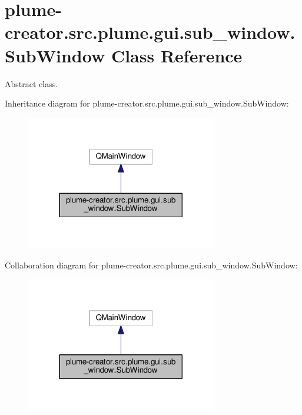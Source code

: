 \hypertarget{classplume-creator_1_1src_1_1plume_1_1gui_1_1sub__window_1_1_sub_window}{}\section{plume-\/creator.src.\+plume.\+gui.\+sub\+\_\+window.\+Sub\+Window Class Reference}
\label{classplume-creator_1_1src_1_1plume_1_1gui_1_1sub__window_1_1_sub_window}


Abstract class.  




Inheritance diagram for plume-\/creator.src.\+plume.\+gui.\+sub\+\_\+window.\+Sub\+Window\+:\nopagebreak
\begin{figure}[H]
\begin{center}
\leavevmode
\includegraphics[width=236pt]{classplume-creator_1_1src_1_1plume_1_1gui_1_1sub__window_1_1_sub_window__inherit__graph}
\end{center}
\end{figure}


Collaboration diagram for plume-\/creator.src.\+plume.\+gui.\+sub\+\_\+window.\+Sub\+Window\+:\nopagebreak
\begin{figure}[H]
\begin{center}
\leavevmode
\includegraphics[width=236pt]{classplume-creator_1_1src_1_1plume_1_1gui_1_1sub__window_1_1_sub_window__coll__graph}
\end{center}
\end{figure}
